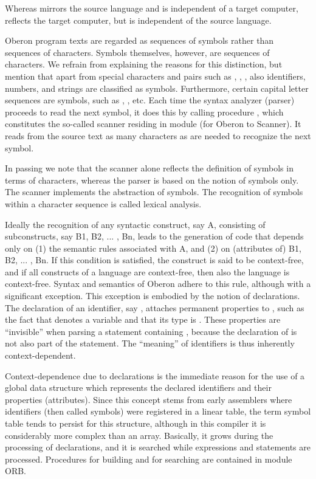 Whereas  mirrors the source language and is independent of a target computer,  reflects the target computer, but is independent of the source language.

Oberon program texts are regarded as sequences of symbols rather than sequences of characters. Symbols themselves, however, are sequences of characters. We refrain from explaining the reasons for this distinction, but mention that apart from special characters and pairs such as \code{+}, \code{\&}, \code{<=}, also identifiers, numbers, and strings are classified as symbols. Furthermore, certain capital letter sequences are symbols, such as , , etc. Each time the syntax analyzer (parser) proceeds to read the next symbol, it does this by calling procedure , which constitutes the so-called scanner residing in module  (for Oberon to \RISC Scanner). It reads from the source text as many characters as are needed to recognize the next symbol.

In passing we note that the scanner alone reflects the definition of symbols in terms of characters, whereas the parser is based on the notion of symbols only. The scanner implements the abstraction of symbols. The recognition of symbols within a character sequence is called lexical analysis.

Ideally the recognition of any syntactic construct, say A, consisting of subconstructs, say B1, B2, ... , Bn, leads to the generation of code that depends only on (1) the semantic rules associated with A, and (2) on (attributes of) B1, B2, ... , Bn. If this condition is satisfied, the construct is said to be context-free, and if all constructs of a language are context-free, then also the language is context-free. Syntax and semantics of Oberon adhere to this rule, although with a significant exception. This exception is embodied by the notion of declarations. The declaration of an identifier, say , attaches permanent properties to , such as the fact that  denotes a variable and that its type is . These properties are ``invisible'' when parsing a statement containing , because the declaration of  is not also part of the statement. The ``meaning'' of identifiers is thus inherently context-dependent.

Context-dependence due to declarations is the immediate reason for the use of a global data structure which represents the declared identifiers and their properties (attributes). Since this concept stems from early assemblers where identifiers (then called symbols) were registered in a linear table, the term symbol table tends to persist for this structure, although in this compiler it is considerably more complex than an array. Basically, it grows during the processing of declarations, and it is searched while expressions and statements are processed. Procedures for building and for searching are contained in module ORB.

